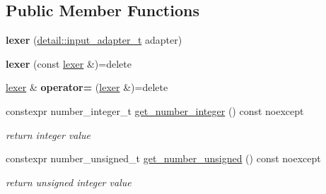 \subsection*{Public Member Functions}
\begin{DoxyCompactItemize}
\item 
\mbox{\label{classnlohmann_1_1detail_1_1lexer_a0d7de7b99bc839ea9a39dd738d05d89c}} 
{\bfseries lexer} (\hyperlink{namespacenlohmann_1_1detail_ae132f8cd5bb24c5e9b40ad0eafedf1c2}{detail\+::input\+\_\+adapter\+\_\+t} adapter)
\item 
\mbox{\label{classnlohmann_1_1detail_1_1lexer_a2e8ce2a0d266d148b69dfbcc2e4ad71a}} 
{\bfseries lexer} (const \hyperlink{classnlohmann_1_1detail_1_1lexer}{lexer} \&)=delete
\item 
\mbox{\label{classnlohmann_1_1detail_1_1lexer_a33e97dee7c5faf1b36aff5b74a6c8f55}} 
\hyperlink{classnlohmann_1_1detail_1_1lexer}{lexer} \& {\bfseries operator=} (\hyperlink{classnlohmann_1_1detail_1_1lexer}{lexer} \&)=delete
\item 
\mbox{\label{classnlohmann_1_1detail_1_1lexer_afa338d17c0a7e834c73104258a2c8ced}} 
constexpr number\+\_\+integer\+\_\+t \hyperlink{classnlohmann_1_1detail_1_1lexer_afa338d17c0a7e834c73104258a2c8ced}{get\+\_\+number\+\_\+integer} () const noexcept
\begin{DoxyCompactList}\small\item\em return integer value \end{DoxyCompactList}\item 
\mbox{\label{classnlohmann_1_1detail_1_1lexer_a56640fb92293e0c17742ca3c814d74d6}} 
constexpr number\+\_\+unsigned\+\_\+t \hyperlink{classnlohmann_1_1detail_1_1lexer_a56640fb92293e0c17742ca3c814d74d6}{get\+\_\+number\+\_\+unsigned} () const noexcept
\begin{DoxyCompactList}\small\item\em return unsigned integer value \end{DoxyCompactList}\item 
\mbox{\label{classnlohmann_1_1detail_1_1lexer_ac013af35a21e9387993b19da5b3e0ae2}} 

\end{DoxyCompactItemize}
